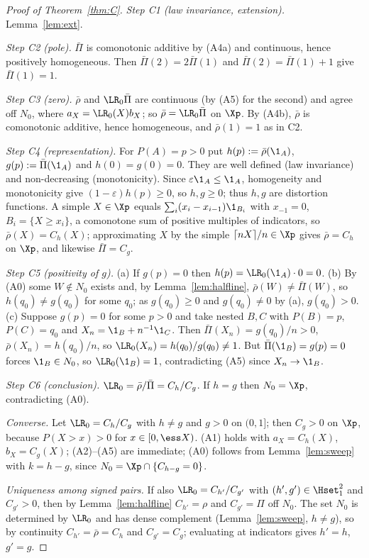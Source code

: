 \begin{proof}[Proof of Theorem~\ref{thm:C}]
\emph{Step C1 (law invariance, extension).} Lemma~\ref{lem:ext}.

\emph{Step C2 (pole).} $\bar\Pi$ is comonotonic additive by (A4a) and continuous, hence positively homogeneous. Then
$\bar\Pi(2)=2\bar\Pi(1)$ and $\bar\Pi(2)=\bar\Pi(1)+1$ give $\bar\Pi(1)=1$.

\emph{Step C3 (zero).} $\bar\rho$ and $\LR_0\bar\Pi$ are continuous (by (A5) for the second) and agree off $N_0$,
where $a_X=\LR_0(X)b_X$; so $\bar\rho=\LR_0\bar\Pi$ on $\Xp$. By (A4b), $\bar\rho$ is comonotonic additive, hence
homogeneous, and $\bar\rho(1)=1$ as in C2.

\emph{Step C4 (representation).} For $P(A)=p>0$ put $h(p):=\bar\rho(\1_A)$, $g(p):=\bar\Pi(\1_A)$ and
$h(0)=g(0)=0$. They are well defined (law invariance) and non-decreasing (monotonicity). Since
$\varepsilon\1_A\le\1_A$, homogeneity and monotonicity give $(1-\varepsilon)h(p)\ge0$, so $h,g\ge0$; thus $h,g$ are
distortion functions. A simple $X\in\Xp$ equals $\sum_i(x_i-x_{i-1})\1_{B_i}$ with $x_{-1}=0$, $B_i=\{X\ge x_i\}$,
a comonotone sum of positive multiples of indicators, so $\bar\rho(X)=C_h(X)$; approximating $X$ by the simple
$\lceil nX\rceil/n\in\Xp$ gives $\bar\rho=C_h$ on $\Xp$, and likewise $\bar\Pi=C_g$.

\emph{Step C5 (positivity of $g$).} (a) If $g(p)=0$ then $h(p)=\LR_0(\1_A)\cdot0=0$. (b) By (A0) some $W\notin N_0$
exists and, by Lemma~\ref{lem:halfline}, $\bar\rho(W)\ne\bar\Pi(W)$, so $h(q_0)\ne g(q_0)$ for some $q_0$; as
$g(q_0)\ge0$ and $g(q_0)\ne0$ by (a), $g(q_0)>0$. (c) Suppose $g(p)=0$ for some $p>0$ and take nested $B,C$ with
$P(B)=p$, $P(C)=q_0$ and $X_n=\1_B+n^{-1}\1_C$. Then $\bar\Pi(X_n)=g(q_0)/n>0$, $\bar\rho(X_n)=h(q_0)/n$, so
$\LR_0(X_n)=h(q_0)/g(q_0)\ne1$. But $\bar\Pi(\1_B)=g(p)=0$ forces $\1_B\in N_0$, so $\LR_0(\1_B)=1$, contradicting (A5)
since $X_n\to\1_B$.

\emph{Step C6 (conclusion).} $\LR_0=\bar\rho/\bar\Pi=C_h/C_g$. If $h=g$ then $N_0=\Xp$, contradicting (A0).

\emph{Converse.} Let $\LR_0=C_h/C_g$ with $h\ne g$ and $g>0$ on $(0,1]$; then $C_g>0$ on $\Xp$, because
$P(X>x)>0$ for $x\in[0,\ess X)$. (A1) holds with $a_X=C_h(X)$, $b_X=C_g(X)$;
(A2)--(A5) are immediate; (A0) follows from Lemma~\ref{lem:sweep} with $k=h-g$, since
$N_0=\Xp\cap\{C_{h-g}=0\}$.

\emph{Uniqueness among signed pairs.} If also $\LR_0=C_{h'}/C_{g'}$ with $(h',g')\in\Hset_1^2$ and $C_{g'}>0$, then by
Lemma~\ref{lem:halfline} $C_{h'}=\rho$ and $C_{g'}=\Pi$ off $N_0$. The set $N_0$ is determined by $\LR_0$ and has dense
complement (Lemma~\ref{lem:sweep}, $h\ne g$), so by continuity $C_{h'}=\bar\rho=C_h$ and $C_{g'}=C_g$; evaluating at
indicators gives $h'=h$, $g'=g$. \qedhere
\end{proof}

